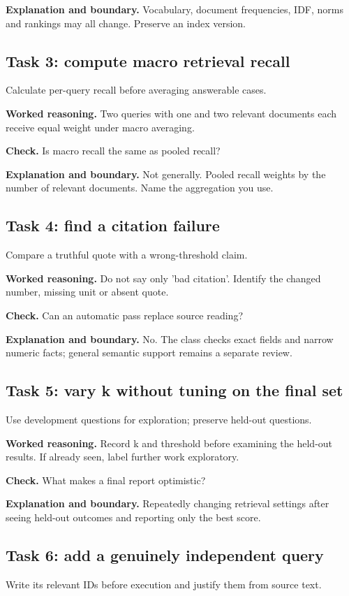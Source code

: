 \textbf{Explanation and boundary.} Vocabulary, document frequencies, IDF, norms and rankings may all change. Preserve an index version.

\subsection{Task 3: compute macro retrieval recall}
Calculate per-query recall before averaging answerable cases.

\textbf{Worked reasoning.} Two queries with one and two relevant documents each receive equal weight under macro averaging.

\textbf{Check.} Is macro recall the same as pooled recall?

\textbf{Explanation and boundary.} Not generally. Pooled recall weights by the number of relevant documents. Name the aggregation you use.

\subsection{Task 4: find a citation failure}
Compare a truthful quote with a wrong-threshold claim.

\textbf{Worked reasoning.} Do not say only 'bad citation'. Identify the changed number, missing unit or absent quote.

\textbf{Check.} Can an automatic pass replace source reading?

\textbf{Explanation and boundary.} No. The class checks exact fields and narrow numeric facts; general semantic support remains a separate review.

\subsection{Task 5: vary k without tuning on the final set}
Use development questions for exploration; preserve held-out questions.

\textbf{Worked reasoning.} Record k and threshold before examining the held-out results. If already seen, label further work exploratory.

\textbf{Check.} What makes a final report optimistic?

\textbf{Explanation and boundary.} Repeatedly changing retrieval settings after seeing held-out outcomes and reporting only the best score.

\subsection{Task 6: add a genuinely independent query}
Write its relevant IDs before execution and justify them from source text.


